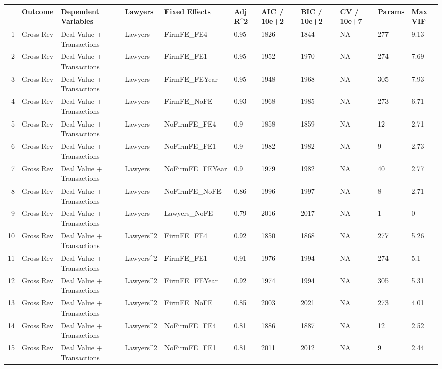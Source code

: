 \begin{table}[ht]
\centering
\begin{tabular}{rllllllllll}
  \hline
 & Outcome & Dependent Variables & Lawyers & Fixed Effects & Adj R^2 & AIC / 10e+2 & BIC / 10e+2 & CV / 10e+7 & Params & Max VIF \\ 
  \hline
1 & Gross Rev & Deal Value + Transactions & Lawyers & FirmFE\_FE4 & 0.95 & 1826 & 1844 & NA & 277 & 9.13 \\ 
  2 & Gross Rev & Deal Value + Transactions & Lawyers & FirmFE\_FE1 & 0.95 & 1952 & 1970 & NA & 274 & 7.69 \\ 
  3 & Gross Rev & Deal Value + Transactions & Lawyers & FirmFE\_FEYear & 0.95 & 1948 & 1968 & NA & 305 & 7.93 \\ 
  4 & Gross Rev & Deal Value + Transactions & Lawyers & FirmFE\_NoFE & 0.93 & 1968 & 1985 & NA & 273 & 6.71 \\ 
  5 & Gross Rev & Deal Value + Transactions & Lawyers & NoFirmFE\_FE4 & 0.9 & 1858 & 1859 & NA & 12 & 2.71 \\ 
  6 & Gross Rev & Deal Value + Transactions & Lawyers & NoFirmFE\_FE1 & 0.9 & 1982 & 1982 & NA & 9 & 2.73 \\ 
  7 & Gross Rev & Deal Value + Transactions & Lawyers & NoFirmFE\_FEYear & 0.9 & 1979 & 1982 & NA & 40 & 2.77 \\ 
  8 & Gross Rev & Deal Value + Transactions & Lawyers & NoFirmFE\_NoFE & 0.86 & 1996 & 1997 & NA & 8 & 2.71 \\ 
  9 & Gross Rev & Deal Value + Transactions & Lawyers & Lawyers\_NoFE & 0.79 & 2016 & 2017 & NA & 1 & 0 \\ 
  10 & Gross Rev & Deal Value + Transactions & Lawyers^2 & FirmFE\_FE4 & 0.92 & 1850 & 1868 & NA & 277 & 5.26 \\ 
  11 & Gross Rev & Deal Value + Transactions & Lawyers^2 & FirmFE\_FE1 & 0.91 & 1976 & 1994 & NA & 274 & 5.1 \\ 
  12 & Gross Rev & Deal Value + Transactions & Lawyers^2 & FirmFE\_FEYear & 0.92 & 1974 & 1994 & NA & 305 & 5.31 \\ 
  13 & Gross Rev & Deal Value + Transactions & Lawyers^2 & FirmFE\_NoFE & 0.85 & 2003 & 2021 & NA & 273 & 4.01 \\ 
  14 & Gross Rev & Deal Value + Transactions & Lawyers^2 & NoFirmFE\_FE4 & 0.81 & 1886 & 1887 & NA & 12 & 2.52 \\ 
  15 & Gross Rev & Deal Value + Transactions & Lawyers^2 & NoFirmFE\_FE1 & 0.81 & 2011 & 2012 & NA & 9 & 2.44 \\ 

\end{tabular}
\end{table}

